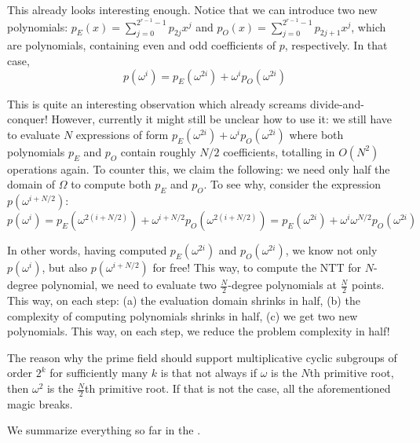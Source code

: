 \documentclass[../lecture-notes.tex]{subfiles}
\begin{document}
This already looks interesting enough. Notice that we can introduce two new polynomials: $p_E(x)=\sum_{j=0}^{2^{r-1}-1}p_{2j}x^{j}$ and $p_O(x)=\sum_{j=0}^{2^{r-1}-1}p_{2j+1}x^{j}$, 
which are polynomials, containing even and odd coefficients of $p$, respectively. In that case, 
\begin{equation*}
    p(\omega^i) = p_E(\omega^{2i}) + \omega^i p_O(\omega^{2i})
\end{equation*}

This is quite an interesting observation which already screams
divide-and-conquer! However, currently it might still be unclear 
how to use it: we still have to evaluate $N$ expressions of 
form $p_E(\omega^{2i}) + \omega^i p_O(\omega^{2i})$ where both 
polynomials $p_E$ and $p_O$ contain roughly $N/2$ coefficients, totalling 
in $O(N^2)$ operations again. To counter this, we claim the following: 
we need only half the domain of $\Omega$ to compute both $p_E$ and $p_O$.
To see why, consider the expression $p(\omega^{i+N/2})$:
\begin{equation*}
    p(\omega^i) = p_E(\omega^{2(i+N/2)}) + \omega^{i+N/2}p_O(\omega^{2(i+N/2)}) = p_E(\omega^{2i}) + \omega^{i}\omega^{N/2}p_O(\omega^{2i})
\end{equation*}

In other words, having computed $p_E(\omega^{2i})$ and $p_O(\omega^{2i})$, we
know not only $p(\omega^i)$, but also $p(\omega^{i+N/2})$ for free! This way, to
compute the \textsf{NTT} for $N$-degree polynomial, we need to evaluate two
$\frac{N}{2}$-degree polynomials at $\frac{N}{2}$ points. This way, on each
step: (a) the evaluation domain shrinks in half, (b) the complexity of computing
polynomials shrinks in half, (c) we get two new polynomials. This way, on each
step, we reduce the problem complexity in half!

The reason why the prime field should support multiplicative cyclic subgroups 
of order $2^k$ for sufficiently many $k$ is that not always if $\omega$ is the 
$N$th primitive root, then $\omega^2$ is the $\frac{N}{2}$th primitive root. If that is 
not the case, all the aforementioned magic breaks.

We summarize everything so far in the .
\end{document}
